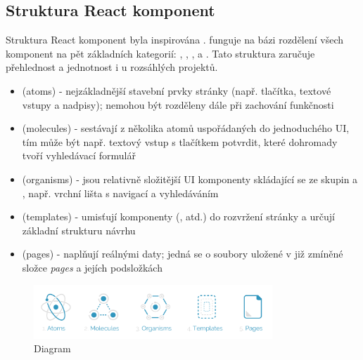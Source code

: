 \documentclass[12pt, a4paper,
 twoside,        %
 openright
]{report}
\newenvironment{propertiesItemize}{
\begin{itemize}{ 
  }}
  {\end{itemize}}
\begin{document}
\subsection{Struktura React komponent}\label{subsubsection:reactComponents}
Struktura React komponent byla inspirována .  funguje na bázi rozdělení všech komponent na pět základních kategorií: , , ,  a . Tato struktura zaručuje přehlednost a jednotnost i u rozsáhlých projektů. \cite{reactComponentsAtomicDesign}
\begin{propertiesItemize}
	\item \textbf{} (atoms) - nejzákladnější stavební prvky stránky (např. tlačítka, textové vstupy a nadpisy); nemohou být rozděleny dále při zachování funkčnosti \cite{reactComponentsAtomicDesign}
	\item \textbf{} (molecules) - sestávají z několika atomů uspořádaných do jednoduchého UI, tím může být např. textový vstup s tlačítkem potvrdit, které dohromady tvoří vyhledávací formulář \cite{reactComponentsAtomicDesign}
	\item \textbf{} (organisms) - jsou relativně složitější UI komponenty skládající se ze skupin  a , např. vrchní lišta s navigací a vyhledáváním \cite{reactComponentsAtomicDesign}
	\item \textbf{} (templates) - umisťují komponenty (, atd.) do rozvržení stránky a určují základní strukturu návrhu \cite{reactComponentsAtomicDesign}
	\item \textbf{} (pages) - naplňují  reálnými daty; jedná se o soubory uložené v již zmíněné složce \textit{pages} a jejích podsložkách \cite{reactComponentsAtomicDesign}
\end{propertiesItemize}
\begin{figure}[h]
	\centering
	\includegraphics[width=0.8\textwidth]{images/react_atomic_design.png}
	\caption{Diagram  \cite{reactComponentsAtomicDesignDiagram}}
\end{figure}
\end{document}
